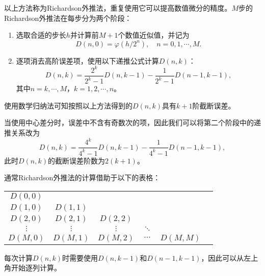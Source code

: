 \documentclass[a4paper,10pt]{ctexart}
\begin{document}
以上方法称为Richardson外推法，重复使用它可以提高数值微分的精度。$ M $步的Richardson外推法在每步分为两个阶段：
\begin{enumerate}
    \item 选取合适的步长$ h $并计算前$ M+1 $个数值近似值，并记为
    \begin{equation}
        D(n,0) = \varphi(h / 2^n),\quad n=0,1,\cdots,M.
    \end{equation}
    \item 逐项消去高阶误差项，使用以下递推公式计算$ D(n,k) $：
    \begin{equation}
        D(n,k) = \frac{2^k}{2^k-1}D(n,k-1) - \frac{1}{2^k-1}D(n-1,k-1),
    \end{equation}
    其中$ n=k,\cdots,M $，$ k=1,2,\cdots,n $。
\end{enumerate}
使用数学归纳法可知按照以上方法得到的$ D(n,k) $具有$ k+1 $阶截断误差。

当使用中心差分时，误差中不含有奇数次的项，因此我们可以将第二个阶段中的递推关系改为
\begin{equation}
    D(n,k) = \frac{4^k}{4^k-1}D(n,k-1) - \frac{1}{4^k-1}D(n-1,k-1),
\end{equation}
此时$ D(n,k) $的截断误差阶数为$ 2(k+1) $。

通常Richardson外推法的计算借助于以下的表格：
\begin{center}
    \begin{tabular}{cccccc}
        \toprule
        $ D(0,0) $ & & & & & \\
        $ D(1,0) $ & $ D(1,1) $ & & & & \\
        $ D(2,0) $ & $ D(2,1) $ & $ D(2,2) $ & & & \\
        $ \vdots $ & $ \vdots $ & $ \vdots $ & $ \ddots $ & & \\
        $ D(M,0) $ & $ D(M,1) $ & $ D(M,2) $ & $ \cdots $ & $ D(M,M) $ & \\
        \bottomrule
    \end{tabular}
\end{center}
每次计算$ D(n,k) $时需要使用$ D(n,k-1) $和$ D(n-1,k-1) $，因此可以从左上角开始逐列计算。
\end{document}
